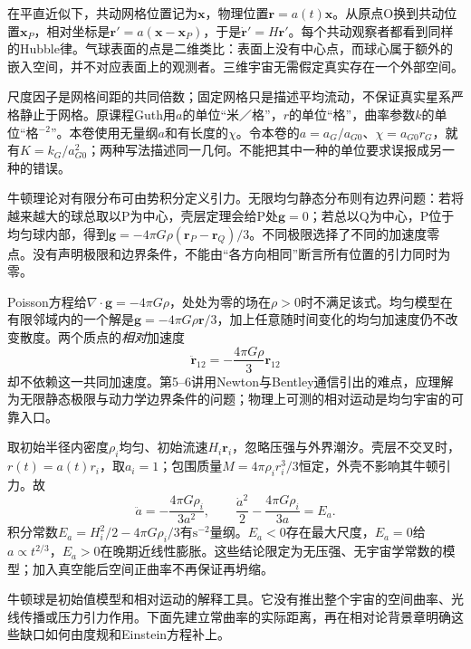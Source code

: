 在平直近似下，共动网格位置记为$\mathbf x$，物理位置$\mathbf r=a(t)\mathbf x$。从原点O换到共动位置$\mathbf x_P$，相对坐标是$\mathbf r'=a(\mathbf x-\mathbf x_P)$，于是$\dot{\mathbf r}'=H\mathbf r'$。每个共动观察者都看到同样的Hubble律。气球表面的点是二维类比：表面上没有中心点，而球心属于额外的嵌入空间，并不对应表面上的观测者。三维宇宙无需假定真实存在一个外部空间。

尺度因子是网格间距的共同倍数；固定网格只是描述平均流动，不保证真实星系严格静止于网格。原课程Guth用$a$的单位“米／格”，$r$的单位“格”，曲率参数$k$的单位“格$^{-2}$”。本卷使用无量纲$a$和有长度的$\chi$。令本卷的$a=a_G/a_{G0}$、$\chi=a_{G0}r_G$，就有$K=k_G/a_{G0}^2$；两种写法描述同一几何。不能把其中一种的单位要求误报成另一种的错误。

牛顿理论对有限分布可由势积分定义引力。无限均匀静态分布则有边界问题：若将越来越大的球总取以P为中心，壳层定理会给P处$\mathbf g=0$；若总以Q为中心，P位于均匀球内部，得到$\mathbf g=-4\pi G\rho(\mathbf r_P-\mathbf r_Q)/3$。不同极限选择了不同的加速度零点。没有声明极限和边界条件，不能由“各方向相同”断言所有位置的引力同时为零。

Poisson方程给$\nabla\cdot\mathbf g=-4\pi G\rho$，处处为零的场在$\rho>0$时不满足该式。均匀模型在有限邻域内的一个解是$\mathbf g=-4\pi G\rho\mathbf r/3$，加上任意随时间变化的均匀加速度仍不改变散度。两个质点的\emph{相对}加速度
\[
 \ddot{\mathbf r}_{12}=-\frac{4\pi G\rho}{3}\mathbf r_{12}
\]
却不依赖这一共同加速度。第5--6讲用Newton与Bentley通信引出的难点，应理解为无限静态极限与动力学边界条件的问题；物理上可测的相对运动是均匀宇宙的可靠入口。

取初始半径内密度$\rho_i$均匀、初始流速$H_i\mathbf r_i$，忽略压强与外界潮汐。壳层不交叉时，$r(t)=a(t)r_i$，取$a_i=1$；包围质量$M=4\pi\rho_i r_i^3/3$恒定，外壳不影响其牛顿引力。故
\[
 \ddot a=-\frac{4\pi G\rho_i}{3a^2},\qquad
 \frac{\dot a^2}{2}-\frac{4\pi G\rho_i}{3a}=E_a.
\]
积分常数$E_a=H_i^2/2-4\pi G\rho_i/3$有$\mathrm{s^{-2}}$量纲。$E_a<0$存在最大尺度，$E_a=0$给$a\propto t^{2/3}$，$E_a>0$在晚期近线性膨胀。这些结论限定为无压强、无宇宙学常数的模型；加入真空能后空间正曲率不再保证再坍缩。

牛顿球是初始值模型和相对运动的解释工具。它没有推出整个宇宙的空间曲率、光线传播或压力引力作用。下面先建立常曲率的实际距离，再在相对论背景章明确这些缺口如何由度规和Einstein方程补上。
